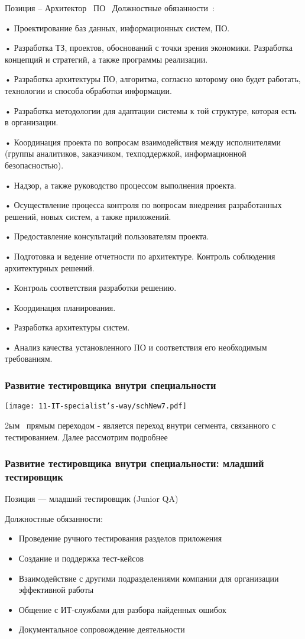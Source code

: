 \documentclass{../industrial-development}
\begin{document}
\lecturenotes

Позиция – Архитектор~\cite{hh} ПО~\cite{itcf}
Должностные обязанности~\cite{rab}: 

•	Проектирование баз данных, информационных систем, ПО. 

•	Разработка ТЗ, проектов, обоснований с точки зрения экономики. Разработка концепций и стратегий, а также программы реализации. 

•	Разработка архитектуры ПО, алгоритма, согласно которому оно будет работать, технологии и способа обработки информации. 

•	Разработка методологии для адаптации системы к той структуре, которая есть в организации. 

•	Координация проекта по вопросам взаимодействия между исполнителями (группы аналитиков, заказчиком, техподдержкой, информационной безопасностью). 

•	Надзор, а также руководство процессом выполнения проекта. 

•	Осуществление процесса контроля по вопросам внедрения разработанных решений, новых систем, а также приложений. 

•	Предоставление консультаций пользователям проекта. 

•	Подготовка и ведение отчетности по архитектуре. Контроль соблюдения архитектурных решений.

•	 Контроль соответствия разработки решению. 

•	Координация планирования.

•	 Разработка архитектуры систем. 

•	Анализ качества установленного ПО и соответствия его необходимым требованиям. 


\begin{frame} \frametitle{Развитие тестировщика внутри специальности }
  \centerline{\texttt{[image: 11-IT-specialist's-way/schNew7.pdf]}}
\end{frame}
\lecturenotes

 2ым~\cite{mc} прямым переходом  - является переход внутри сегмента, связанного с тестированием. Далее рассмотрим подробнее


\begin{frame} \frametitle{Развитие тестировщика внутри специальности: младший тестировщик}
 \begin{block}{}
  \alert{Позиция --- младший тестировщик (Junior QA)}

Должностные обязанности: 
  \end{block}
  \begin{itemize}
  \item Проведение ручного тестирования разделов приложения
  \item Создание и поддержка тест-кейсов
  \item Взаимодействие с другими подразделениями компании для организации эффективной работы
 \item Общение с ИТ-службами для разбора найденных ошибок
\item Документальное сопровождение деятельности
  \end{itemize}
\end{frame}
\end{document}
